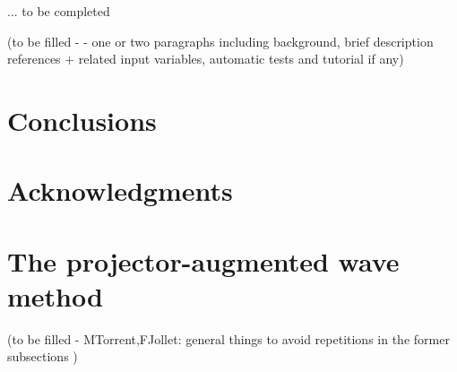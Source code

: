 \documentclass{elsart}
\begin{document}


... to be completed

(to be filled -  - one or two paragraphs including background, brief description references + related input variables, automatic tests and tutorial if any)

\section{Conclusions}



\section{Acknowledgments}

\appendix
\label{appendix}
\section{The projector-augmented wave method  }
(to be filled - MTorrent,FJollet: general things to avoid repetitions in the former subsections )



\end{document}
